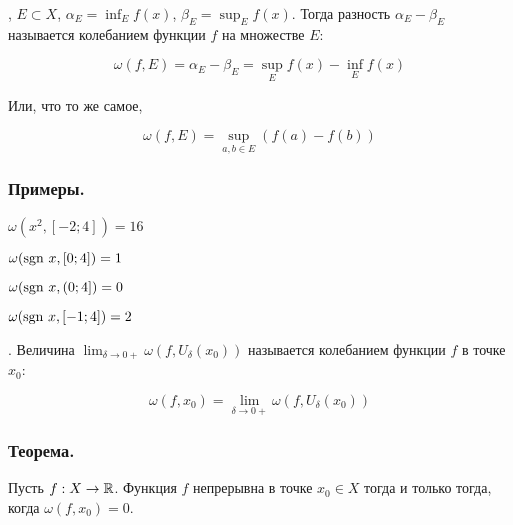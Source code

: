 \opred

\fXR, $E \subset X$, $\alpha_E=\inf_E f(x)$, $\beta_E=\sup_E f(x)$.
Тогда разность $\alpha_E-\beta_E$ называется колебанием функции $f$ на множестве $E$:

$$
\omega(f,E)=\alpha_E-\beta_E=\sup_E f(x) - \inf_E f(x)
$$

Или, что то же самое, 

$$
\omega(f,E)=\sup_{a,b \in E}(f(a)-f(b))
$$

\subsubsection{Примеры.}

$\omega(x^2,[-2;4])=16$

$\omega(\mathrm{sgn}~ x,[0;4])=1$

$\omega(\mathrm{sgn}~ x,(0;4])=0$

$\omega(\mathrm{sgn}~ x,[-1;4])=2$

\opred

\fXRx.
Величина $\lim_{\delta \to 0+}\omega(f,U_{\delta}(x_0))$ называется колебанием функции $f$ в точке $x_0$:

$$
\omega(f,x_0)=\lim_{\delta \to 0+}\omega(f,U_{\delta}(x_0))
$$

\subsubsection{Теорема.}

Пусть $f:X\to\mathbb{R}$.
Функция $f$ непрерывна в точке $x_0\in X$ тогда и только тогда, когда $\omega(f,x_0)=0$.
